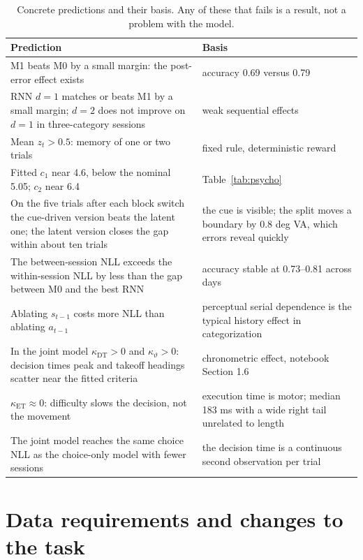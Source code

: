 \documentclass[11pt,a4paper]{article}
\begin{document}
\begin{table}[H]
  \centering\small
  \caption{Concrete predictions and their basis. Any of these that fails is a result,
  not a problem with the model.}
  \begin{tabular}{p{9.5cm}p{5.5cm}}
    \toprule
    Prediction & Basis \\
    \midrule
    M1 beats M0 by a small margin: the post-error effect exists & accuracy 0.69 versus 0.79 \\
    RNN $d=1$ matches or beats M1 by a small margin; $d=2$ does not improve on $d=1$ in three-category sessions & weak sequential effects \\
    Mean $z_t > 0.5$: memory of one or two trials & fixed rule, deterministic reward \\
    Fitted $c_1$ near 4.6, below the nominal 5.05; $c_2$ near 6.4 & Table~\ref{tab:psycho} \\
    On the five trials after each block switch the cue-driven version beats the latent one; the latent version closes the gap within about ten trials & the cue is visible; the split moves a boundary by 0.8 deg VA, which errors reveal quickly \\
    The between-session NLL exceeds the within-session NLL by less than the gap between M0 and the best RNN & accuracy stable at 0.73--0.81 across days \\
    Ablating $s_{t-1}$ costs more NLL than ablating $a_{t-1}$ & perceptual serial dependence is the typical history effect in categorization \\
    In the joint model $\kappa_{\mathrm{DT}} > 0$ and $\kappa_{\vartheta} > 0$: decision times peak and takeoff headings scatter near the fitted criteria & chronometric effect, notebook Section 1.6 \\
    $\kappa_{\mathrm{ET}} \approx 0$: difficulty slows the decision, not the movement & execution time is motor; median 183 ms with a wide right tail unrelated to length \\
    The joint model reaches the same choice NLL as the choice-only model with fewer sessions & the decision time is a continuous second observation per trial \\
    \bottomrule
  \end{tabular}
\end{table}

\section{Data requirements and changes to the task}
\label{sec:datareq}
\end{document}
